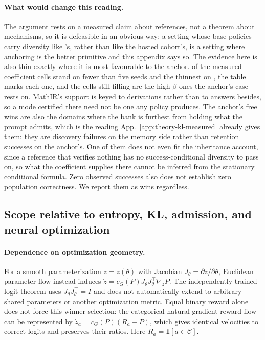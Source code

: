 \documentclass{article}
\newcommand{\1}{\mathbf 1}
\theoremstyle{remark}
\theoremstyle{definition}
\theoremstyle{plain}
\begin{document}
\paragraph{What would change this reading.}
The argument rests on a measured claim about references, not a theorem about
mechanisms, so it is defeasible in an obvious way: a setting whose base
policies carry diversity like \MDklWinDomain{}'s, rather than like the hosted
cohort's, is a setting where anchoring is the better primitive and this
appendix says so.
The evidence here is also thin exactly where it is most favourable to the
anchor. \MDklThinCells{} of the \MDklTotalCells{} measured coefficient cells
stand on fewer than five seeds and the thinnest on \MDklSeedsMin{}, the table
marks each one, and the cells still filling are the high-$\beta$ ones the
anchor's case rests on. MathIR's support is keyed to derivations rather than to
answers besides, so a mode certified there need not be one any policy produces.
The anchor's free wins are also the domains where the bank is furthest from
holding what the prompt admits, which is the reading
App.~\ref{app:theory-kl-measured} already gives them: they are discovery
failures on the memory side rather than retention successes on the anchor's.
One of them does not even fit the inheritance account, since a reference that
verifies nothing has no success-conditional diversity to pass on, so what the
coefficient supplies there cannot be inferred from the stationary
conditional formula. Zero observed successes also does not establish
zero population correctness. We report them as wins regardless.

\subsection{Scope relative to entropy, KL, admission, and neural optimization}
\label{app:theory-entropy}
\label{app:theory-entropy-comparison}

\paragraph{Dependence on optimization geometry.}
For a smooth parameterization $z=z(\theta)$ with Jacobian
$J_\theta=\partial z/\partial\theta$, Euclidean parameter flow instead
induces $\dot z=c_G(P)J_\theta J_\theta^\top\nabla_zP$. The independently
trained logit theorem uses $J_\theta J_\theta^\top=I$ and does not automatically
extend to arbitrary shared parameters or another optimization metric. Equal
binary reward alone does not force this winner selection: the categorical
natural-gradient reward flow can be represented by
$\dot z_a=c_G(P)(R_a-P)$, which gives identical velocities to correct logits
and preserves their ratios. Here $R_a=\1[a\in\mathcal C]$.
\end{document}
